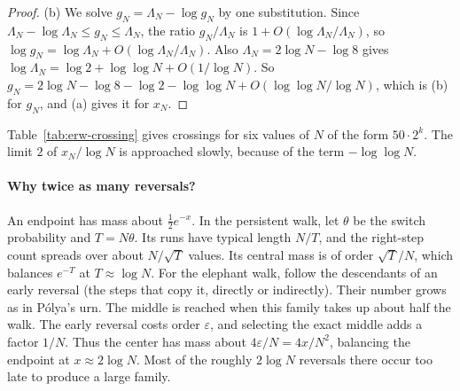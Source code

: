 \begin{proof}
(b) We solve $g_N=\Lambda_N-\log g_N$ by one substitution. Since
$\Lambda_N-\log\Lambda_N\le g_N\le\Lambda_N$, the ratio $g_N/\Lambda_N$ is
$1+O(\log\Lambda_N/\Lambda_N)$, so
$\log g_N=\log\Lambda_N+O(\log\Lambda_N/\Lambda_N)$. Also
$\Lambda_N=2\log N-\log8$ gives
$\log\Lambda_N=\log2+\log\log N+O(1/\log N)$. So
$g_N=2\log N-\log8-\log2-\log\log N+O(\log\log N/\log N)$, which is (b) for
$g_N$, and (a) gives it for $x_N$.
\end{proof}

Table~\ref{tab:erw-crossing} gives crossings for six values of $N$ of the
form $50\cdot2^k$. The limit $2$ of $x_N/\log N$ is approached
slowly, because of the term $-\log\log N$.


\paragraph{Why twice as many reversals?}
An endpoint has mass about $\frac12e^{-x}$. In the persistent walk,
let $\theta$ be the switch probability and $T=N\theta$.
Its runs have typical length $N/T$, and the right-step count spreads
over about $N/\sqrt T$ values. Its central mass is of order $\sqrt T/N$,
which balances $e^{-T}$ at $T\approx\log N$.
For the elephant walk, follow the descendants of an early reversal
(the steps that copy it, directly or indirectly). Their number grows
as in P\'olya's urn. The middle is reached when this family takes up
about half the walk. The early reversal costs order $\varepsilon$,
and selecting the exact middle adds a factor $1/N$. Thus the center has mass
about $4\varepsilon/N=4x/N^2$, balancing the endpoint at
$x\approx2\log N$. Most of the roughly $2\log N$ reversals there
occur too late to produce a large family.
